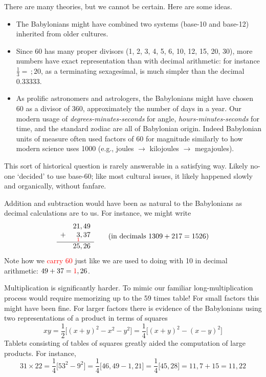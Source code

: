 
There are many theories, but we cannot be certain. Here are some ideas.
\begin{itemize}
  \item The Babylonians might have combined two systems (base-10 and base-12) inherited from older cultures.
  \item Since 60 has many proper divisors (1, 2, 3, 4, 5, 6, 10, 12, 15, 20, 30), more numbers have exact representation than with decimal arithmetic: for instance $\frac 13=\,;20$, as a terminating sexagesimal, is much simpler than the decimal $0.33333$.
  \item As prolific astronomers and astrologers, the Babylonians might have chosen 60 as a divisor of 360, approximately the number of days in a year. Our modern usage of \emph{degrees-minutes-seconds} for angle, \emph{hours-minutes-seconds} for time, and the standard zodiac are all of Babylonian origin. Indeed Babylonian units of measure often used factors of 60 for magnitude similarly to how modern science uses 1000 (e.g., joules $\rightarrow$ kilojoules $\rightarrow$ megajoules). 
\end{itemize}
This sort of historical question is rarely answerable in a satisfying way. Likely no-one `decided' to use base-60; like most cultural issues, it likely happened slowly and organically, without fanfare.


\label{babmult}

Addition and subtraction would have been as natural to the Babylonians as decimal calculations are to us. For instance, we might write
\[
	\begin{array}{rr@{,\,}r}
		&21&49\\
		+&\underset{\textcolor{red}{1}}{3}&37\\\hline
		&25&26\\
	\end{array} 
	\tag{in decimals $1309+217=1526$}
\]
Note how we \textcolor{red}{carry 60} just like we are used to doing with 10 in decimal arithmetic: $49+37=\textcolor{red}{1},26$.
\smallbreak

Multiplication is significantly harder. To mimic our familiar long-multiplication process would require memorizing up to the 59 times table! For small factors this might have been fine. For larger factors there is evidence of the Babylonians using two representations of a product in terms of squares
\[
	xy=\frac 12\bigl[(x+y)^2-x^2-y^2\bigr]=\frac 14\bigl[(x+y)^2-(x-y)^2\bigr]
\]
Tablets consisting of tables of squares greatly aided the computation of large products. For instance,
\[
	31\times 22 =\frac 14\bigl[53^2-9^2\bigr] 
	=\frac 14\bigl[46,49-1,21\bigr] 
	=\frac 14\bigl[45,28\bigr] 
	=11,7+15=11,22 \tag{$=682$}
\]


